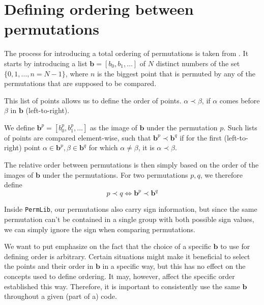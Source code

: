 \documentclass[parskip=half]{scrartcl}
\newcommand{\code}[1]{\texttt{#1}}
\begin{document}
	\section{Defining ordering between permutations}
	\label{sec:OrderPermutations}

	The process for introducing a total ordering of permutations is taken from \textcite{Manssur2002a}. It starts by introducing a list $\mathbf{b} =
	[b_0, b_1, \ldots]$ of $N$ distinct numbers of the set $\{ 0, 1, \ldots, n = N - 1 \}$, where $n$ is the biggest point that is permuted by any of
	the permutations that are supposed to be compared.

	This list of points allows us to define the order of points. $\alpha \prec \beta$, if $\alpha$ comes before $\beta$ in $\mathbf{b}$
	(left-to-right).\supercite{Manssur2002a}

	We define $\mathbf{b}^p = [ b_0^p, b_1^p, \ldots ]$ as the image of $\mathbf{b}$ under the permutation $p$. Such lists of points are compared
	element-wise, such that $\mathbf{b}^p \prec \mathbf{b}^q$ if for the first (left-to-right) point $\alpha \in \mathbf{b}^p, \beta \in \mathbf{b}^q$
	for which $\alpha \neq \beta$, it is $\alpha \prec \beta$.\supercite{Manssur2002a}

	The relative order between permutations is then simply based on the order of the images of $\mathbf{b}$ under the permutations. For two
	permutations $p,q$, we therefore define\supercite{Manssur2002a}
	\begin{equation}
		p \prec q \iff \mathbf{b}^p \prec \mathbf{b}^q
	\end{equation}

	Inside \code{PermLib}, our permutations also carry sign information, but since the same permutation can't be contained in a single group with both
	possible sign values\supercite{Manssur2002a}, we can simply ignore the sign when comparing permutations.\supercite{Manssur2002a}

	We want to put emphasize on the fact that the choice of a specific $\mathbf{b}$ to use for defining order is arbitrary. Certain situations might
	make it beneficial to select the points and their order in $\mathbf{b}$ in a specific way, but this has no effect on the concepts used to define
	ordering. It may, however, affect the specific order established this way. Therefore, it is important to consistently use the same $\mathbf{b}$
	throughout a given (part of a) code.


	\cleardoublepage
	\printbibliography
\end{document}
